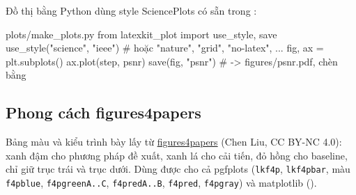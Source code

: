 \documentclass[10pt,a4paper]{article}
\begin{document}
\begin{demo}
\end{demo}

Đồ thị bằng Python dùng style SciencePlots có sẵn trong :
\begin{lkcode}[Python]{plots/make\_plots.py}
from latexkit_plot import use_style, save
use_style("science", "ieee")      # hoặc "nature", "grid", "no-latex", ...
fig, ax = plt.subplots()
ax.plot(step, psnr)
save(fig, "psnr")                 # -> figures/psnr.pdf, chèn bằng 
\end{lkcode}

\subsection{Phong cách figures4papers}
Bảng màu và kiểu trình bày lấy từ \href{https://github.com/ChenLiu-1996/figures4papers}{figures4papers}
(Chen Liu, CC BY-NC 4.0): xanh đậm cho phương pháp đề xuất, xanh lá cho cải tiến, đỏ hồng cho
baseline, chỉ giữ trục trái và trục dưới. Dùng được cho cả pgfplots (\texttt{lkf4p},
\texttt{lkf4pbar}, màu \texttt{f4pblue}, \texttt{f4pgreenA..C}, \texttt{f4predA..B}, \texttt{f4pred},
\texttt{f4pgray}) và matplotlib ().
\begin{demo}
\end{demo}
\end{document}
